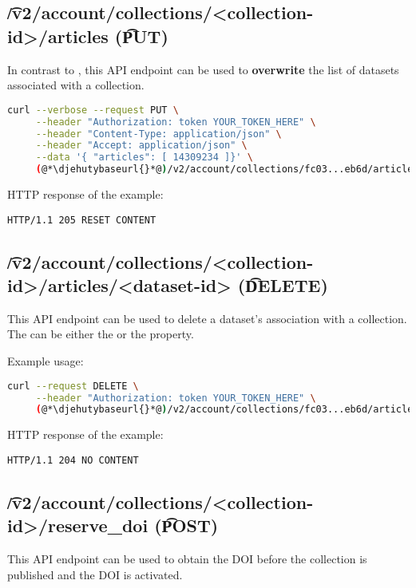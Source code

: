 \subsection{\t{/v2/account/collections/<collection-id>/articles} (\t{PUT})}

  In contrast to , this API endpoint
  can be used to \textbf{overwrite} the list of datasets associated with a
  collection.

\begin{lstlisting}[language=bash]
curl --verbose --request PUT \
     --header "Authorization: token YOUR_TOKEN_HERE" \
     --header "Content-Type: application/json" \
     --header "Accept: application/json" \
     --data '{ "articles": [ 14309234 ]}' \
     (@*\djehutybaseurl{}*@)/v2/account/collections/fc03...eb6d/articles
\end{lstlisting}

  HTTP response of the example:
\begin{lstlisting}
HTTP/1.1 205 RESET CONTENT
\end{lstlisting}

\subsection{\t{/v2/account/collections/<collection-id>/articles/<dataset-id>} (\t{DELETE})}

  This API endpoint can be used to delete a dataset's association with a collection.
  The  can be either the  or the  property.

  Example usage:
\begin{lstlisting}[language=bash]
curl --request DELETE \
     --header "Authorization: token YOUR_TOKEN_HERE" \
     (@*\djehutybaseurl{}*@)/v2/account/collections/fc03...eb6d/articles/8050...10db
\end{lstlisting}

  HTTP response of the example:
\begin{lstlisting}
HTTP/1.1 204 NO CONTENT
\end{lstlisting}

\subsection{\t{/v2/account/collections/<collection-id>/reserve\_doi} (\t{POST})}

  This API endpoint can be used to obtain the DOI before the collection is
  published and the DOI is activated.

